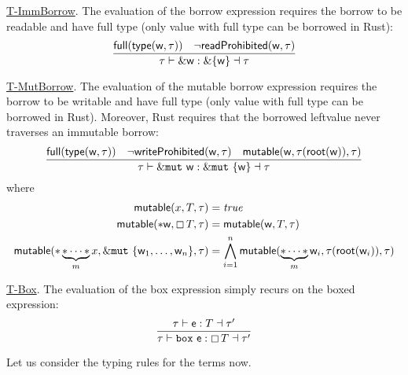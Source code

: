 \underline{\textsf{T-ImmBorrow}}.
The evaluation of the borrow expression requires the borrow to be readable and have full type
(only value with full type can be borrowed in Rust):
\[
\frac
    {\mathsf{full}(\mathsf{type}(\mathsf{w},\tau))\quad\neg\mathsf{readProhibited}(\mathsf{w},\tau)}
    {\tau\vdash\&\mathsf{w}:\&\{\mathsf{w}\}\dashv\tau}
\]

\underline{\textsf{T-MutBorrow}}.
The evaluation of the mutable borrow expression requires the borrow to be writable and have full type
(only value with full type can be borrowed in Rust). Moreover, Rust requires that
the borrowed leftvalue never traverses an immutable borrow:
\[
\frac
    {\mathsf{full}(\mathsf{type}(\mathsf{w},\tau))\quad\neg\mathsf{writeProhibited}(\mathsf{w},\tau)
    \quad\mathsf{mutable}(\mathsf{w},\tau(\mathsf{root}(\mathsf{w})),\tau)}
    {\tau\vdash\&\mathtt{mut}\ \mathsf{w}:\&\mathtt{mut}\ \{\mathsf{w}\}\dashv\tau}
\]
where
\begin{align*}
  \mathsf{mutable}(x,T,\tau)&=\mathit{true}\\
  \mathsf{mutable}(\mathtt{*}\mathsf{w},\boxempty\,{T},\tau)&=\mathsf{mutable}(\mathsf{w},T,\tau)\\
  \mathsf{mutable}(\mathtt{*}\underbrace{\mathtt{*}\cdots\mathtt{*}}_mx,
  \&\mathtt{mut}\ \{\mathsf{w}_1,\ldots,\mathsf{w}_n\},\tau)&=\bigwedge\limits_{i=1}^n
  \mathsf{mutable}(\underbrace{\mathtt{*}\cdots\mathtt{*}}_m\mathsf{w}_i,
  \tau(\mathsf{root}(\mathsf{w}_i)),\tau)
\end{align*}

\underline{\textsf{T-Box}}.
The evaluation of the box expression simply recurs on the boxed expression:
\[
\frac
    {\tau\vdash\mathsf{e}:T\dashv\tau'}
    {\tau\vdash\mathtt{box}\ \mathsf{e}:\boxtype{T}\dashv\tau'}
\]

Let us consider the typing rules for the terms now.
